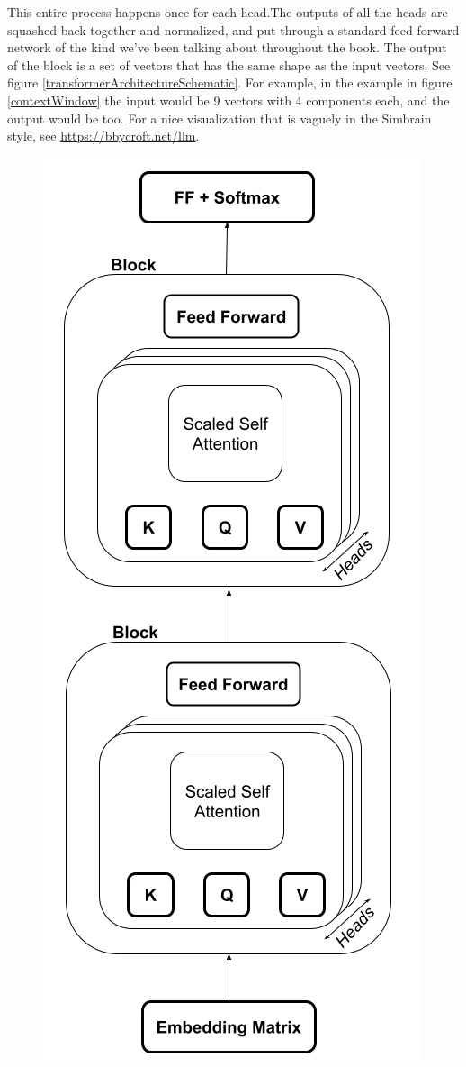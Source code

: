 This entire process happens once for each head.The outputs of all the heads are squashed back together and normalized, and put through a standard feed-forward network of the kind we've been talking about throughout the book. The output of the block is a set of vectors that has the same shape as the input vectors. See figure \ref{transformerArchitectureSchematic}.  For example, in the example in figure \ref{contextWindow} the input would be 9 vectors with 4 components each, and the output would be too. For a nice visualization that is vaguely in the Simbrain style, see \url{https://bbycroft.net/llm}.

\begin{figure}[h]
\centering
\includegraphics[scale=.35]{./images/transformerArchitectureSchematic.png}

\end{figure}
